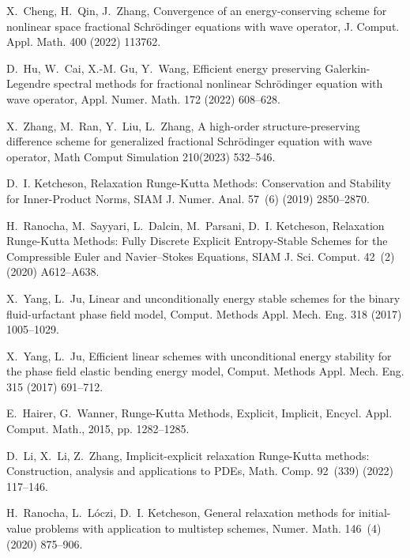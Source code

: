 \documentclass[preprint,compress,3p,10pt,fleqn]{elsarticle}
\numberwithin{equation}{section}
\begin{document}
\begin{thebibliography}{10}
	X.~Cheng, H.~Qin, J.~Zhang, Convergence of an energy-conserving scheme for nonlinear space fractional
	  Schr\"odinger equations with wave operator, J. Comput. Appl. Math. 400 (2022) 113762.

	D.~Hu, W.~Cai, X.-M. Gu, Y.~Wang, Efficient  energy preserving Galerkin-Legendre spectral methods for
	  fractional nonlinear Schr\"odinger equation with wave operator, Appl. Numer. Math. 172 (2022) 608--628.

	  X.~Zhang, M.~Ran, Y.~Liu, L.~Zhang, A high-order structure-preserving difference scheme for generalized fractional
		Schr\"odinger equation with wave operator, Math Comput Simulation 210(2023) 532--546.

	D.~I. Ketcheson, Relaxation Runge-Kutta Methods: Conservation and Stability for Inner-Product Norms,
       SIAM J. Numer. Anal. 57~(6) (2019) 2850--2870.

	H.~Ranocha, M.~Sayyari, L.~Dalcin, M.~Parsani, D.~I. Ketcheson,
	  Relaxation Runge-Kutta Methods: Fully Discrete Explicit Entropy-Stable Schemes
	  for the Compressible Euler and Navier--Stokes Equations, SIAM J.
	  Sci. Comput. 42~(2) (2020) A612--A638.

	X.~Yang, L.~Ju, Linear and unconditionally energy stable schemes for the binary fluid-urfactant phase field model,
      Comput. Methods Appl. Mech. Eng. 318 (2017) 1005--1029.

	X.~Yang, L.~Ju, Efficient linear schemes with unconditional energy stability for the phase field
	  elastic bending energy model, Comput. Methods Appl. Mech. Eng. 315 (2017) 691--712.

    E.~Hairer, G.~Wanner, Runge-Kutta  Methods, Explicit, Implicit, Encycl. Appl. Comput. Math., 2015, pp. 1282--1285.

	D.~Li, X.~Li, Z.~Zhang, Implicit-explicit relaxation Runge-Kutta methods: Construction, analysis and applications
	  to PDEs, Math. Comp. 92~(339) (2022) 117--146.

	H.~Ranocha, L.~L{\'o}czi, D.~I. Ketcheson, General relaxation methods
	  for initial-value problems with application to multistep schemes, Numer.
	  Math. 146~(4) (2020) 875--906.


\end{thebibliography}
\end{document}
